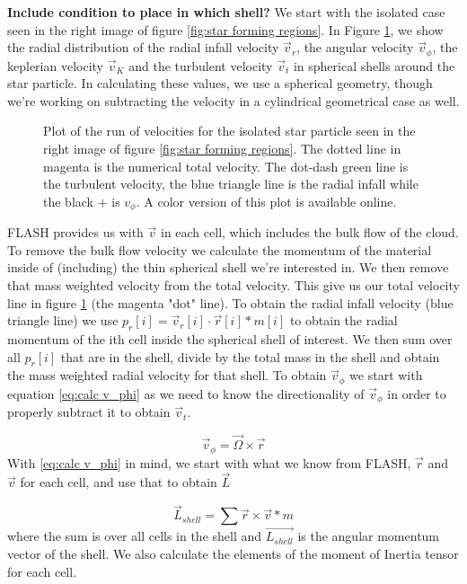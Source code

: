 \documentclass{emulateapj}
\newcommand{\be}{\begin{equation}}
\newcommand{\ee}{\end{equation}}
\begin{document}
{\bf Include condition to place in which shell?}
We start with the isolated case seen in the right image of figure \ref{fig:star forming regions}. In Figure \ref{fig:quad3_320_velocity_example}, we show the radial distribution of the radial infall velocity $\vec{v}_r$, the angular velocity $\vec{v}_{\phi}$, the keplerian velocity $\vec{v}_{K}$ and the turbulent velocity $\vec{v}_{t}$ in spherical shells around the star particle. In calculating these values, we use a spherical geometry, though we're working on subtracting the velocity in a  cylindrical geometrical case as well. 

\begin{figure}
\caption{Plot of the run of velocities for the isolated star particle seen in the right image of figure \ref{fig:star forming regions}. The dotted line in magenta is the numerical total velocity. The dot-dash green line is the turbulent velocity, the blue triangle line is the radial infall while the black $+$ is $v_{\phi}$. A color version of this plot is available online.
\label{fig:quad3_320_velocity_example}}
\end{figure}

FLASH provides us with $\vec{v}$ in each cell, which includes the bulk flow of the cloud. To remove the bulk flow velocity we calculate the momentum of the material inside of (including) the thin spherical shell we're interested in. We then remove that mass weighted velocity from the total velocity. This give us our total velocity line in figure \ref{fig:quad3_320_velocity_example} (the magenta "dot" line). 
To obtain the radial infall velocity (blue triangle line) we use $p_r[i] = \vec{v}_r[i] \cdot \vec{r}[i] * m[i]$ to obtain the radial momentum of the ith cell inside the spherical shell of interest. We then sum over all $p_{r}[i]$ that are in the shell, divide by the total mass in the shell and obtain the mass weighted radial velocity for that shell. 
To obtain $\vec{v}_{\phi}$ we start with equation \ref{eq:calc v_phi} as we need to know the directionality of $\vec{v}_{\phi}$ in order to properly subtract it to obtain $\vec{v}_{t}$.

\be
\vec{v}_{\phi} = \vec{\Omega} \times \vec{r}
\label{eq:calc v_phi}
\ee
With \ref{eq:calc v_phi} in mind, we start with what we know from FLASH, $\vec{r}$ and $\vec{v}$ for each cell, and use that to obtain $\vec{L}$

\be
\vec{L}_{shell} = \sum{\vec{r} \times \vec{v} * m}
\label{eq:calc L shell}
\ee
where the sum is over all cells in the shell and $\vec{L_{shell}}$ is the angular momentum vector of the shell. We also calculate the elements of the moment of Inertia tensor for each cell.
\end{document}
